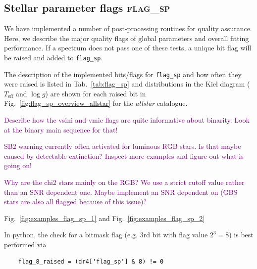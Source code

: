 \documentclass[
  journal=pasa,
  manuscript=research-paper, %
  year=2024,
  volume=37
]{cup-journal}
\newcommand{\SB}[1]{{\textcolor{purple}{#1}}}
\newcommand{\Teff}{$T_\mathrm{eff}$\xspace}
\newcommand{\logg}{$\log g$\xspace}
\begin{document}
\subsection{Stellar parameter flags \textsc{flag\_sp}}
\label{sec:flag_sp}

We have implemented a number of post-processing routines for quality assurance. Here, we describe the major quality flags of global parameters and overall fitting performance. If a spectrum does not pass one of these tests, a unique bit flag will be raised and added to \texttt{flag\_sp}.

The description of the implemented bits/flags for \texttt{flag\_sp} and how often they were raised is listed in Tab.~\ref{tab:flag_sp} and distributions in the Kiel diagram (\Teff and \logg) are shown for each raised bit in Fig.~\ref{fig:flag_sp_overview_allstar} for the \textit{allstar} catalogue.

\SB{Describe how the vsini and vmic flags are quite informative about binarity. Look at the binary main sequence for that!}

\SB{SB2 warning currently often activated for luminous RGB stars. Is that maybe caused by detectable extinction? Inspect more examples and figure out what is going on!}

\SB{Why are the chi2 stars mainly on the RGB? We use a strict cutoff value rather than an SNR dependent one. Maybe implement an SNR dependent on (GBS stars are also all flagged because of this issue)?}

Fig.~\ref{fig:examples_flag_sp_1} and Fig.~\ref{fig:examples_flag_sp_2}

In python, the check for a bitmask flag (e.g. 3rd bit with flag value $2^3 = 8$) is best performed via 
\begin{verbatim}
    flag_8_raised = (dr4['flag_sp'] & 8) != 0
\end{verbatim}


\end{document}
